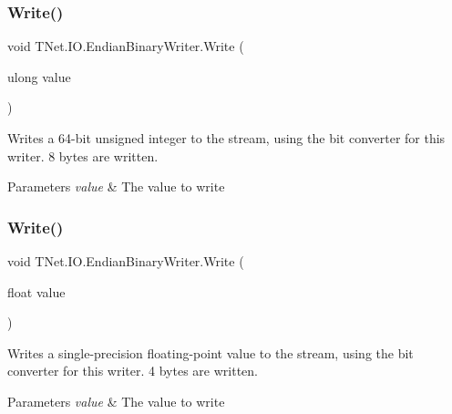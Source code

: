 \subsubsection{\texorpdfstring{Write()}{Write()}\hspace{0.1cm}{\footnotesize\ttfamily [7/17]}}
{\footnotesize\ttfamily void T\+Net.\+I\+O.\+Endian\+Binary\+Writer.\+Write (\begin{DoxyParamCaption}\item[{ulong}]{value }\end{DoxyParamCaption})}



Writes a 64-\/bit unsigned integer to the stream, using the bit converter for this writer. 8 bytes are written. 


\begin{DoxyParams}{Parameters}
{\em value} & The value to write\\
\hline
\end{DoxyParams}
\mbox{\label{class_t_net_1_1_i_o_1_1_endian_binary_writer_a409db831b5ba46bd1c0cec923669e71a}} 
\subsubsection{\texorpdfstring{Write()}{Write()}\hspace{0.1cm}{\footnotesize\ttfamily [8/17]}}
{\footnotesize\ttfamily void T\+Net.\+I\+O.\+Endian\+Binary\+Writer.\+Write (\begin{DoxyParamCaption}\item[{float}]{value }\end{DoxyParamCaption})}



Writes a single-\/precision floating-\/point value to the stream, using the bit converter for this writer. 4 bytes are written. 


\begin{DoxyParams}{Parameters}
{\em value} & The value to write\\
\hline
\end{DoxyParams}
\mbox{\label{class_t_net_1_1_i_o_1_1_endian_binary_writer_a9754ae46a8054f3949eba2576a5e15a0}} 
